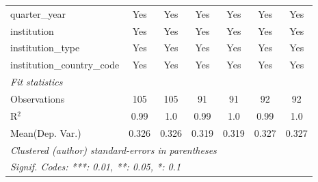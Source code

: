 \begin{tabular}{lcccccc}
   quarter\_year                 & Yes           & Yes            & Yes            & Yes           & Yes            & Yes\\  
   institution                   & Yes           & Yes            & Yes            & Yes           & Yes            & Yes\\  
   institution\_type             & Yes           & Yes            & Yes            & Yes           & Yes            & Yes\\  
   institution\_country\_code    & Yes           & Yes            & Yes            & Yes           & Yes            & Yes\\  
   \midrule
   \emph{Fit statistics}\\
   Observations                  & 105           & 105            & 91             & 91            & 92             & 92\\  
   R$^2$                         & 0.99          & 1.0            & 0.99           & 1.0           & 0.99           & 1.0\\  
Mean(Dep. Var.) & 0.326 & 0.326 & 0.319 & 0.319 & 0.327 & 0.327 \\
   \midrule \midrule
   \multicolumn{7}{l}{\emph{Clustered (author) standard-errors in parentheses}}\\
   \multicolumn{7}{l}{\emph{Signif. Codes: ***: 0.01, **: 0.05, *: 0.1}}\\
\end{tabular}
\par\endgroup

